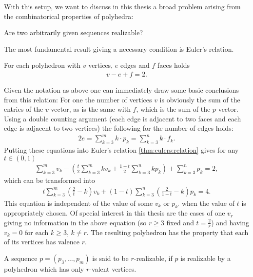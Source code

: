 With this setup, we want to discuss in this thesis a broad problem arising from the combinatorical properties of polyhedra:
\begin{problem} Are two arbitrarily given sequences realizable?
\end{problem}
The most fundamental result giving a necessary condition is Euler's relation.
\begin{theorem}\label{thm:eulers:relation}
  For each polyhedron with $v$ vertices, $e$ edges and $f$ faces holds
  \begin{align*}
    v - e + f = 2.
  \end{align*}
\end{theorem}
Given the notation as above one can immediately draw some basic conclusions from this relation: For one the number of vertices $v$ is obviously the sum of the entries of the $v$-vector, as is the same with $f$, which is the sum of the $p$-vector. Using a double counting argument (each edge is adjacent to two faces and each edge is adjacent to two vertices) the following for the number of edges holds:
\begin{align*}
  2e = \sum_{k=3}^{m} k \cdot p_k = \sum_{k=3}^{n} k \cdot f_k.
\end{align*}
Putting these equations into Euler's relation \autoref{thm:eulers:relation} gives for any $t \in (0, 1)$
\begin{align*}
  \sum_{k=3}^m v_k - \left(\frac{t}{2} \sum_{k=3}^m k v_k + \frac{1-t}{2} \sum_{k=3}^n k p_k \right) + \sum_{k=3}^n p_k = 2,
\end{align*}
which can be transformed into
\begin{align}
  t \sum_{k=3}^m \left(\frac{2}{t} - k \right) v_k + (1-t) \sum_{k=3}^n \left( \frac{2}{1-t} - k \right) p_k = 4. \label{eq:general:vp:relation}
\end{align}
This equation is independent of the value of some $v_k$ or $p_{k'}$ when the value of $t$ is appropriately chosen. Of special interest in this thesis are the cases of one $v_r$ giving no information in the above equation (so $r \geq 3$ fixed and $t = \frac{2}{r}$) and having $v_{k} = 0$ for each $k \geq 3$, $k \neq r$. The resulting polyhedron has the property that each of its vertices has valence $r$.
\begin{definition}[$r$-realizable]\label{def:r:realizable}
  A sequence $p = (p_3, \dots, p_m)$ is said to be $r$-realizable, if $p$ is realizable by a polyhedron which has only $r$-valent vertices.
\end{definition}
